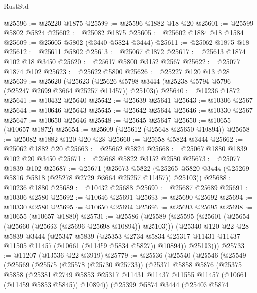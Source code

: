 \begin{lexlean}{RustStd}
\begin{coremodule}
@25596 := @25220 @1875
@25599 := @25596 @1882 @18 @20
@25601 := @25599 @5802 @5824
@25602 := @25082 @1875
@25605 := @25602 @1884 @18 @1584
@25609 := @25605 @5802 (@3440 @5824 @3444)
@25611 := @25062 @1875 @18
@25612 := @25611 @5802
@25613 := @25067 @1872
@25617 := @25613 @1874 @102 @18 @3450
@25620 := @25617 @5800 @3152 @2567
@25622 := @25077 @1874 @102
@25623 := @25622 @5800
@25626 := @25227 @120 @13 @28
@25639 := @25620
    (@25623 (@25626 @5798 @3444 (@25238 @5794 @5796 (@25247 @2699 @3664 @25257 @11457)) @25103))
@25640 := @10236 @1872
@25641 := @10432 @25640
@25642 := @25639 @25641
@25643 := @10306 @2567
@25644 := @10646 @25643
@25645 := @25642 @25644
@25646 := @10330 @2567
@25647 := @10650 @25646
@25648 := @25645 @25647
@25650 := @10655 (@10657 @1872)
@25654 := @25609 (@25612 (@25648 @25650 @10894))
@25658 := @25082 @1882 @120 @20 @28
@25660 := @25658 @5824 @3444
@25662 := @25062 @1882 @20
@25663 := @25662 @5824
@25668 := @25067 @1880 @1839 @102 @20 @3450
@25671 := @25668 @5822 @3152 @2580
@25673 := @25077 @1839 @102
@25687 := @25671
    (@25673
      @5822
      (@25265 @5820 @3444 (@25269 @5816 @5818 (@25278 @2729 @3664 @25257 @11457)) @25103))
@25688 := @10236 @1880
@25689 := @10432 @25688
@25690 := @25687 @25689
@25691 := @10306 @2580
@25692 := @10646 @25691
@25693 := @25690 @25692
@25694 := @10330 @2580
@25695 := @10650 @25694
@25696 := @25693 @25695
@25698 := @10655 (@10657 @1880)
@25730 := @25586
    (@25589
      (@25595
        (@25601 (@25654 (@25660 (@25663 (@25696 @25698 @10894)) @25103)))
        (@25340
          @120
          @22
          @28
          @5839
          @3444
          (@25347
            @5839
            (@25353
              @2734
              @5834
              @25317
              @11431
              @11437
              @11505
              @11457
              (@10661 (@11459 @5834 @5827))
              @10894))
          @25103)))
@25733 := @11207 (@13536 @22 @3919)
@25779 := @25536
    (@25540
      (@25546
        (@25549
          (@25569
            (@25575
              (@25578 (@25730 @25733))
              (@25371
                @5858
                @5876
                (@25375
                  @5858
                  (@25381
                    @2749
                    @5853
                    @25317
                    @11431
                    @11437
                    @11555
                    @11457
                    (@10661 (@11459 @5853 @5845))
                    @10894))
                (@25399
                  @5874
                  @3444
                  (@25403
                    @5874

\end{coremodule}
\end{lexlean}
